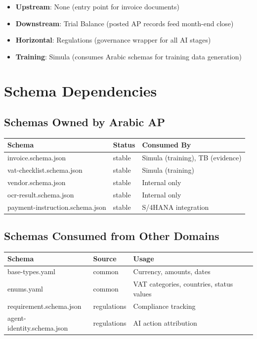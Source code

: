 \documentclass[11pt,a4paper,twoside]{report}
\begin{document}
\begin{itemize}
  \item \textbf{Upstream}: None (entry point for invoice documents)
  \item \textbf{Downstream}: Trial Balance (posted AP records feed month-end close)
  \item \textbf{Horizontal}: Regulations (governance wrapper for all AI stages)
  \item \textbf{Training}: Simula (consumes Arabic schemas for training data generation)
\end{itemize}

\section{Schema Dependencies}
\label{sec:schema-deps}

\subsection{Schemas Owned by Arabic AP}

\begin{tabularx}{\linewidth}{@{}l l X@{}}
\toprule
\textbf{Schema} & \textbf{Status} & \textbf{Consumed By} \\
\midrule
invoice.schema.json & stable & Simula (training), TB (evidence) \\
vat-checklist.schema.json & stable & Simula (training) \\
vendor.schema.json & stable & Internal only \\
ocr-result.schema.json & stable & Internal only \\
payment-instruction.schema.json & stable & S/4HANA integration \\
\bottomrule
\end{tabularx}

\subsection{Schemas Consumed from Other Domains}

\begin{tabularx}{\linewidth}{@{}l l X@{}}
\toprule
\textbf{Schema} & \textbf{Source} & \textbf{Usage} \\
\midrule
base-types.yaml & common & Currency, amounts, dates \\
enums.yaml & common & VAT categories, countries, status values \\
requirement.schema.json & regulations & Compliance tracking \\
agent-identity.schema.json & regulations & AI action attribution \\
\bottomrule
\end{tabularx}
\end{document}
